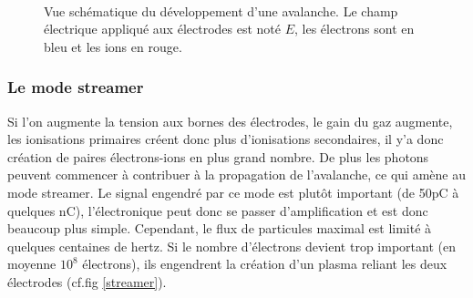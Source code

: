 \begin{figure}[ht!]
\centering
{}
\hfill
{}
\\
\hfill
{}
\caption{Vue schématique du développement d'une avalanche. Le champ électrique appliqué aux électrodes est noté $E$, les électrons sont en bleu et les ions en rouge.}
\label{avalanche}
\end{figure}

\subsubsection{Le mode streamer}
Si l'on augmente la tension aux bornes des électrodes, le gain du gaz augmente, les ionisations primaires créent donc plus d'ionisations secondaires, il y'a donc création de paires électrons-ions  en plus grand nombre. De plus les photons peuvent commencer à contribuer à la propagation de l'avalanche, ce qui amène au mode streamer. Le signal engendré par ce mode est plutôt important (de 50pC à quelques nC), l'électronique peut donc se passer d'amplification et est donc beaucoup plus simple. Cependant, le flux de particules maximal est limité à quelques centaines de hertz. Si le nombre d'électrons devient trop important (en moyenne $10^{8}$ électrons), ils engendrent la création d'un plasma reliant les deux électrodes (cf.fig \ref{streamer}).

